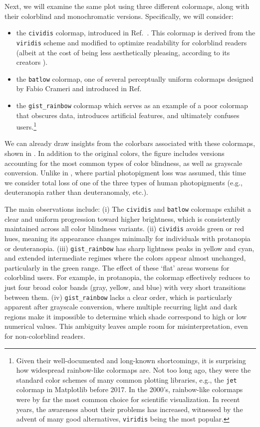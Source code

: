 Next, we will examine the same plot using three different colormaps, along with their colorblind and monochromatic versions. Specifically, we will consider:
\begin{itemize}
\item the \verb|cividis| colormap, introduced in Ref.~\cite{nunez2018}. This colormap is derived from the \verb|viridis| scheme and modified to optimize readability for colorblind readers (albeit at the cost of being less aesthetically pleasing, according to its creators \cite{nunez2018}).
\item the \verb|batlow| colormap, one of several perceptually uniform colormaps designed by Fabio Crameri and introduced in Ref.~\cite{crameri2020}
\item the \verb|gist_rainbow| colormap  which serves as an example of a poor colormap that obscures data, introduces artificial features, and ultimately confuses users.\footnote{Given their well-documented and long-known shortcomings, it is surprising how widespread rainbow-like colormaps are. Not too long ago, they were the standard color schemes of many common plotting libraries, e.g., the \texttt{jet} colormap in Matplotlib before 2017. In the 2000's, rainbow-like colormaps were by far the most common choice for scientific visualization.
In recent years, the awareness about their problems has increased, witnessed by the advent of many good alternatives, \texttt{viridis} being the most popular.}
\end{itemize}

We can already draw insights from the colorbars associated with these colormaps, shown in . In addition to the original colors, the figure includes versions accounting for the most common types of color blindness, as well as grayscale conversion. Unlike in , where partial photopigment loss was assumed, this time we consider total loss of one of the three types of human photopigments (e.g., deuteranopia rather than deuteranomaly, etc.).


The main observations include: (i) The \verb|cividis| and \verb|batlow| colormaps exhibit a clear and uniform progression toward higher brightness, which is consistently maintained across all color blindness variants. (ii) \verb|cividis| avoids green or red hues, meaning its appearance changes minimally for individuals with protanopia or deuteranopia. (iii) \verb|gist_rainbow| has sharp lightness peaks in yellow and cyan, and extended intermediate regimes where the colors appear almost unchanged, particularly in the green range. The effect of these `flat' areas worsens for colorblind users. For example, in protanopia, the colormap effectively reduces to just four broad color bands (gray, yellow, and blue) with very short transitions between them. (iv) \verb|gist_rainbow| lacks a clear order, which is particularly apparent after grayscale conversion, where multiple recurring light and dark regions make it impossible to determine which shade correspond to high or low numerical values. This ambiguity leaves ample room for misinterpretation, even for non-colorblind readers.


